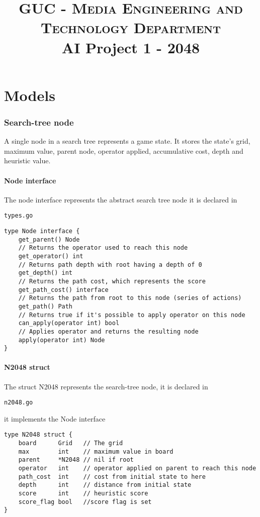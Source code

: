 \documentclass[14pt,a4paper]{report}
\begin{document}
\title{
    \textsc{GUC - Media Engineering and Technology Department} \\
    AI Project 1 - 2048
}


\renewcommand{\abstractname}{Brief}
\begin{abstract}

\end{abstract}

\tableofcontents

\part{Models}

\section{Search-tree node}
A single node in a search tree represents a game state. It stores the state's 
grid, maximum value, parent node, operator applied, accumulative cost, depth and
heuristic value. 



\subsection{Node interface}
The node interface represents the abstract search tree node it is declared
in \begin{verbatim}types.go\end{verbatim}
\begin{lstlisting}
type Node interface {
    get_parent() Node
    // Returns the operator used to reach this node
    get_operator() int
    // Returns path depth with root having a depth of 0
    get_depth() int
    // Returns the path cost, which represents the score
    get_path_cost() interface
    // Returns the path from root to this node (series of actions)
    get_path() Path
    // Returns true if it's possible to apply operator on this node
    can_apply(operator int) bool
    // Applies operator and returns the resulting node
    apply(operator int) Node
}
\end{lstlisting}

\subsection{N2048 struct}
The struct N2048 represents the search-tree node, it is declared in 
\begin{verbatim}n2048.go\end{verbatim} it implements the Node interface 
\begin{lstlisting}
type N2048 struct {
    board      Grid   // The grid
    max        int    // maximum value in board
    parent     *N2048 // nil if root
    operator   int    // operator applied on parent to reach this node
    path_cost  int    // cost from initial state to here
    depth      int    // distance from initial state
    score      int    // heuristic score
    score_flag bool   //score flag is set
}
\end{lstlisting}
\vfill
\end{document}
